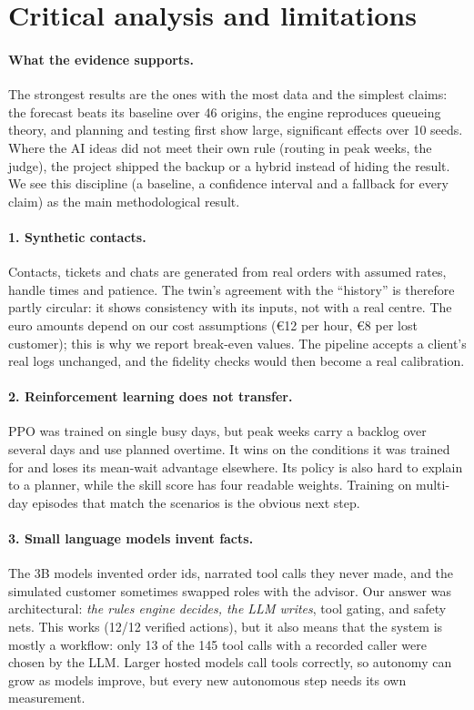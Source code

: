\section{Critical analysis and limitations}
\label{sec:analysis}

\paragraph{What the evidence supports.} The strongest results are the ones with the most data and the simplest
claims: the forecast beats its baseline over 46 origins, the engine reproduces queueing theory, and planning
and testing first show large, significant effects over 10 seeds. Where the AI ideas did not meet their own
rule (routing in peak weeks, the judge), the project shipped the backup or a hybrid instead of hiding the
result. We see this discipline (a baseline, a confidence interval and a fallback for every claim) as the main
methodological result.

\paragraph{1. Synthetic contacts.} Contacts, tickets and chats are generated from real orders with assumed
rates, handle times and patience. The twin's agreement with the ``history'' is therefore partly circular: it
shows consistency with its inputs, not with a real centre. The euro amounts depend on our cost assumptions
(€12 per hour, €8 per lost customer); this is why we report break-even values. The pipeline accepts a client's
real logs unchanged, and the fidelity checks would then become a real calibration.

\paragraph{2. Reinforcement learning does not transfer.} PPO was trained on single busy days, but peak weeks
carry a backlog over several days and use planned overtime. It wins on the conditions it was trained for and
loses its mean-wait advantage elsewhere. Its policy is also hard to explain to a planner, while the skill score
has four readable weights. Training on multi-day episodes that match the scenarios is the obvious next step.

\paragraph{3. Small language models invent facts.} The 3B models invented order ids, narrated tool calls they
never made, and the simulated customer sometimes swapped roles with the advisor. Our answer was architectural: \emph{the rules engine
decides, the LLM writes}, tool gating, and safety nets. This works (12/12 verified actions), but it also means
that the system is mostly a workflow: only 13 of the 145 tool calls with a recorded caller were chosen by the
LLM. Larger hosted models call tools correctly, so autonomy can grow as models improve, but every new
autonomous step needs its own measurement.

